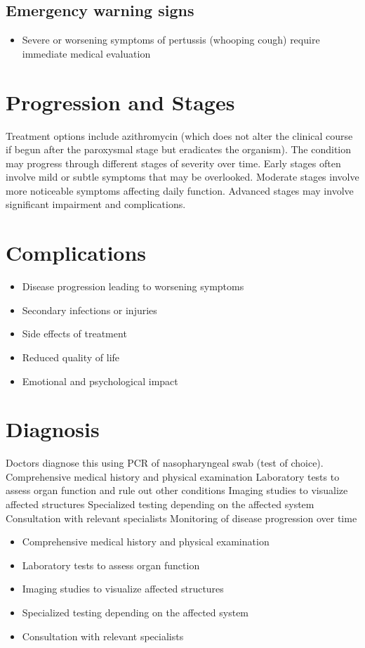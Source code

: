 \subsection{Emergency warning signs}
\begin{itemize}[noitemsep]
  \item Severe or worsening symptoms of pertussis (whooping cough) require immediate medical evaluation
\end{itemize}
\section{Progression and Stages}
Treatment options include azithromycin (which does not alter the clinical course if begun after the paroxysmal stage but eradicates the organism). The condition may progress through different stages of severity over time. Early stages often involve mild or subtle symptoms that may be overlooked. Moderate stages involve more noticeable symptoms affecting daily function. Advanced stages may involve significant impairment and complications.
\section{Complications}
\begin{itemize}[noitemsep]
  \item Disease progression leading to worsening symptoms
  \item Secondary infections or injuries
  \item Side effects of treatment
  \item Reduced quality of life
  \item Emotional and psychological impact
\end{itemize}
\section{Diagnosis}
Doctors diagnose this using PCR of nasopharyngeal swab (test of choice). Comprehensive medical history and physical examination Laboratory tests to assess organ function and rule out other conditions Imaging studies to visualize affected structures Specialized testing depending on the affected system Consultation with relevant specialists Monitoring of disease progression over time

\begin{itemize}[noitemsep]
  \item Comprehensive medical history and physical examination
  \item Laboratory tests to assess organ function
  \item Imaging studies to visualize affected structures
  \item Specialized testing depending on the affected system
  \item Consultation with relevant specialists
\end{itemize}
